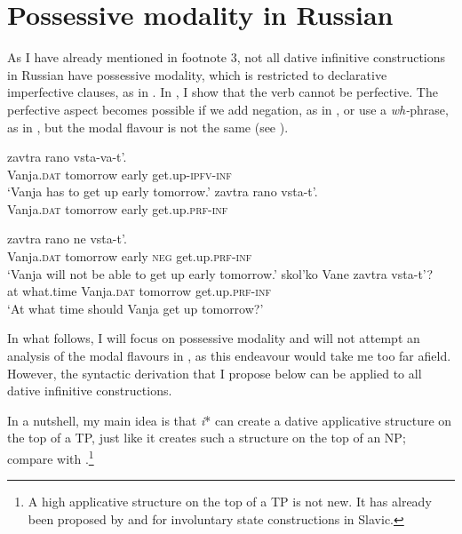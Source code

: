 \documentclass[output=paper,colorlinks,citecolor=brown,modfonts,nonflat]{langsci/langscibook}
\begin{document}
\section{Possessive modality in Russian}\label{sec:tsedryk:4}

As I have already mentioned in footnote 3, not all dative infinitive constructions in Russian have possessive modality, which is restricted to declarative imperfective clauses, as in . In , I show that the verb cannot be perfective. The perfective aspect becomes possible if we add negation, as in , or use a \textit{wh-}phrase, as in , but the modal flavour is not the same (see \citealt{Fortuin2007, Tsedryk2018}).

\ea%
    \label{ex:tsedryk:29}
    \ea\label{ex:tsedryk:29a}
              {zavtra}       {rano}   {vsta-va-t’}.\\
            Vanja.\textsc{dat}  tomorrow  early  get.up-\textsc{ipfv-inf}\\
    \glt    ‘Vanja has to get up early tomorrow.’
    \ex\label{ex:tsedryk:29b}
              {zavtra}       {rano}   {vsta-t’}.\\
            Vanja.\textsc{dat}  tomorrow  early  get.up.\textsc{prf-inf}\\
    \z
\z

\ea%
    \label{ex:tsedryk:30}
    \ea\label{ex:tsedryk:30a}
             {zavtra}       {rano}   {ne}     {vsta-t’}.\\
            Vanja.\textsc{dat}  tomorrow  early  \textsc{neg}    get.up.\textsc{prf-inf}\\
    \glt    ‘Vanja will not be able to get up early tomorrow.’
    \ex\label{ex:tsedryk:30b}
        {skol’ko}       {Vane}           {zavtra}         {vsta-t’}?\\
            at    what.time    Vanja.\textsc{dat}  tomorrow    get.up.\textsc{prf-inf}\\
    \glt    ‘At what time should Vanja get up tomorrow?’
    \z
\z

In what follows, I will focus on possessive modality and will not attempt an analysis of the modal flavours in , as this endeavour would take me too far afield. However, the syntactic derivation that I propose below can be applied to all dative infinitive constructions.

In a nutshell, my main idea is that \textit{i}* can create a dative applicative structure on the top of a TP, just like it creates such a structure on the top of an NP; compare  with .\footnote{A high applicative structure on the top of a TP is not new. It has already been proposed by \citet{Rivero2009} and \citet{RiveroArregui2012} for involuntary state constructions in Slavic.}
\end{document}
